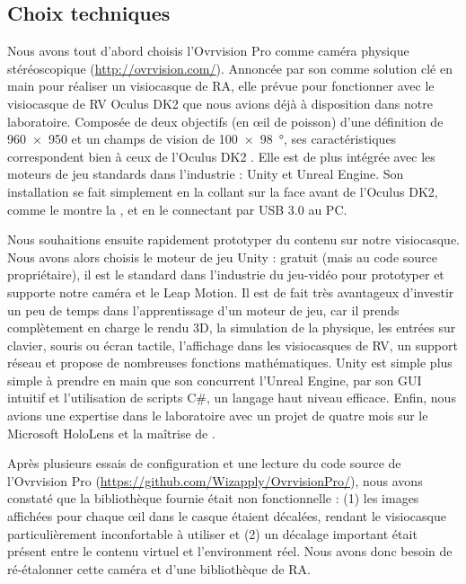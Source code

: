 \subsection{Choix techniques}
\label{subsec:technical_choices}
Nous avons tout d'abord choisis l'Ovrvision Pro comme caméra physique stéréoscopique (\url{http://ovrvision.com/}). Annoncée par son comme solution clé en main pour réaliser un visiocasque de RA, elle prévue pour fonctionner avec le visiocasque de RV Oculus DK2 que nous avions déjà à disposition dans notre laboratoire. Composée de deux objectifs  (en \oe il de poisson) d'une définition de \SI{960x950}{\px} et un champs de vision de \SI{100x98}{\degree}, ses caractéristiques correspondent bien à ceux de l'Oculus DK2 . Elle est de plus intégrée avec les moteurs de jeu standards dans l'industrie : Unity et Unreal Engine. Son installation se fait simplement en la collant sur la face avant de l'Oculus DK2, comme le montre la , et en le connectant par USB 3.0 au PC.


Nous souhaitions ensuite rapidement prototyper du contenu sur notre visiocasque. Nous avons alors choisis le moteur de jeu Unity : gratuit (mais au code source propriétaire), il est le standard dans l'industrie du jeu-vidéo pour prototyper et supporte notre caméra et le Leap Motion. Il est de fait très avantageux d'investir un peu de temps dans l'apprentissage d'un moteur de jeu, car il prends complètement en charge le rendu 3D, la simulation de la physique, les entrées sur clavier, souris ou écran tactile, l'affichage dans les visiocasques de RV, un support réseau et propose de nombreuses fonctions mathématiques. Unity est simple plus simple à prendre en main que son concurrent l'Unreal Engine, par son GUI intuitif et l'utilisation de scripts C\#, un langage haut niveau efficace. Enfin, nous avions une expertise dans le laboratoire avec un projet de quatre mois sur le Microsoft HoloLens et la maîtrise de \cite{Millette2016}.

Après plusieurs essais de configuration et une lecture du code source de l'Ovrvision Pro (\url{https://github.com/Wizapply/OvrvisionPro/}), nous avons constaté que la bibliothèque fournie était non fonctionnelle : (1) les images affichées pour chaque \oe il dans le casque étaient décalées, rendant le visiocasque particulièrement inconfortable à utiliser et (2) un décalage important était présent entre le contenu virtuel et l'environment réel. Nous avons donc besoin de ré-étalonner cette caméra et d'une bibliothèque de RA.

